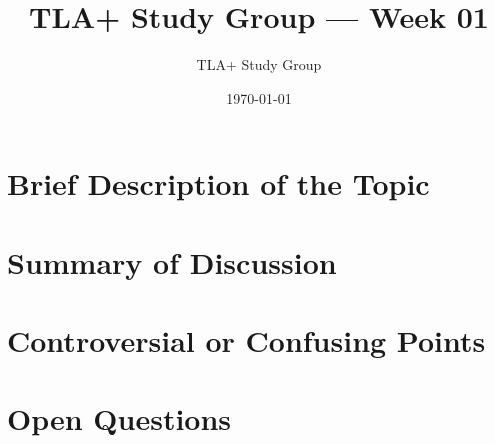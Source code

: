 \documentclass[11pt]{article}
\title{TLA+ Study Group — Week 01}
\author{TLA+ Study Group}
\date{\today}
\begin{document}
\maketitle

\section*{Brief Description of the Topic}

\section*{Summary of Discussion}

\section*{Controversial or Confusing Points}

\section*{Open Questions}
\end{document}
